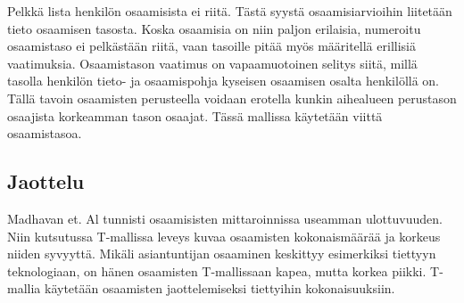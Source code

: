 \documentclass[a4paper,finnish,12pt]{article}
\begin{document}
Pelkkä lista henkilön osaamisista ei riitä. Tästä syystä osaamisiarvioihin liitetään tieto osaamisen tasosta. Koska osaamisia on niin paljon erilaisia, numeroitu osaamistaso ei pelkästään riitä, vaan tasoille pitää myös määritellä erillisiä vaatimuksia. Osaamistason vaatimus on vapaamuotoinen selitys siitä, millä tasolla henkilön tieto- ja osaamispohja kyseisen osaamisen osalta henkilöllä on. Tällä tavoin osaamisten perusteella voidaan erotella kunkin aihealueen perustason osaajista korkeamman tason osaajat. Tässä mallissa käytetään viittä osaamistasoa.


\subsection{Jaottelu}

Madhavan et. Al tunnisti osaamisisten mittaroinnissa useamman ulottuvuuden. Niin kutsutussa T-mallissa leveys kuvaa osaamisten kokonaismäärää ja korkeus niiden syvyyttä. Mikäli asiantuntijan osaaminen keskittyy esimerkiksi tiettyyn teknologiaan, on hänen osaamisten T-mallissaan kapea, mutta korkea piikki. T-mallia käytetään osaamisten jaottelemiseksi tiettyihin kokonaisuuksiin. \cite{ICT-haasteet}
\end{document}
